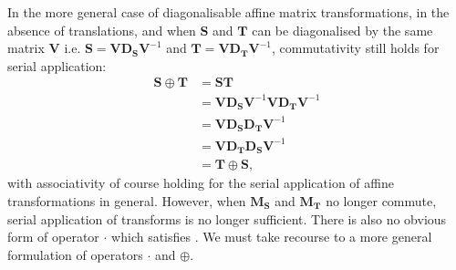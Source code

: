 		In the more general case of diagonalisable affine matrix transformations, in the absence of translations, and when $\mathbf{S}$ and $\mathbf{T}$ can be diagonalised by the same matrix $\mathbf{V}$ i.e. $\mathbf{S} = \mathbf{VD_SV}^{-1}$ and $\mathbf{T} = \mathbf{VD_TV}^{-1}$, commutativity still holds for serial application:
        \begin{equation}
          \begin{split}
      			\mathbf{S} \oplus \mathbf{T} &= \mathbf{ST} \\
                                         &= \mathbf{VD_SV}^{-1}\mathbf{VD_TV}^{-1} \\
                                         &= \mathbf{VD_SD_TV}^{-1} \\
                                         &= \mathbf{VD_TD_SV}^{-1} \\
                                         &= \mathbf{T} \oplus \mathbf{S},
          \end{split}
        \end{equation}
        with associativity of course holding for the serial application of affine transformations in general. However, when $\mathbf{M_S}$ and $\mathbf{M_T}$ no longer commute, serial application of transforms is no longer sufficient. There is also no obvious form of operator $\cdot$ which satisfies . We must take recourse to a more general formulation of operators $\cdot$ and $\oplus$.
        

